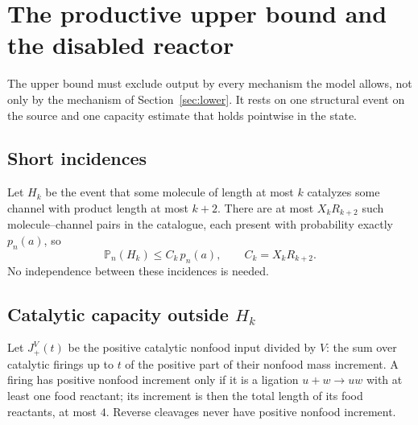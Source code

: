 \documentclass[11pt,letterpaper]{article}
\theoremstyle{plain}
\theoremstyle{definition}
\theoremstyle{remark}
\numberwithin{equation}{section}
\newcommand{\PP}{\mathbb P}
\begin{document}
\section{The productive upper bound and the disabled reactor}\label{sec:upper}

The upper bound must exclude output by every mechanism the model allows, not only by the mechanism of Section~\ref{sec:lower}. It rests on one structural event on the source and one capacity estimate that holds pointwise in the state.

\subsection{Short incidences}
Let $H_k$ be the event that some molecule of length at most $k$ catalyzes some channel with product length at most $k+2$. There are at most $X_kR_{k+2}$ such molecule--channel pairs in the catalogue, each present with probability exactly $p_n(a)$, so
\begin{equation}\label{eq:shortprob}
 \PP_n(H_k)\le C_k\,p_n(a),\qquad C_k=X_kR_{k+2}.
\end{equation}
No independence between these incidences is needed.

\subsection{Catalytic capacity outside \texorpdfstring{$H_k$}{H\_k}}
Let $J^V_+(t)$ be the positive catalytic nonfood input divided by $V$: the sum over catalytic firings up to $t$ of the positive part of their nonfood mass increment. A firing has positive nonfood increment only if it is a ligation $u+w\to uw$ with at least one food reactant; its increment is then the total length of its food reactants, at most $4$. Reverse cleavages never have positive nonfood increment.
\end{document}
